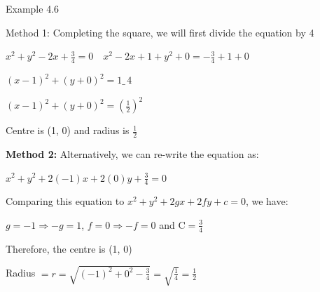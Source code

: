 \begin{example}{Example 4.6}
\begin{enumerate}
  Method 1: Completing the square, we will first divide the equation by 4

  $x^2 + y^2 - 2x + \frac{3}{4} = 0 \quad x^2 - 2x + 1 + y^2 + 0 = -\frac{3}{4} + 1 + 0$

  $(x - 1)^2 + (y + 0)^2 = 1 \_\, 4$

  $\left(x - 1\right)^2 + \left(y + 0\right)^2 = \left(\frac{1}{2}\right)^2$

  Centre is (1, 0) and radius is $\frac{1}{2}$

  \textbf{Method 2:} Alternatively, we can re-write the equation as:

  $x^2 + y^2 + 2(-1)x + 2(0)y + \frac{3}{4} = 0$

  Comparing this equation to $x^2 + y^2 + 2gx + 2fy + c = 0$, we have:

  $g = -1 \Longrightarrow -g = 1$, $f = 0 \Longrightarrow -f = 0$ and C$= \frac{3}{4}$

  Therefore, the centre is (1, 0)

  Radius $= r = \sqrt{(-1)^2 + 0^2 - \frac{3}{4}} = \sqrt{\frac{1}{4}} = \frac{1}{2}$
\end{enumerate}
\end{example}
